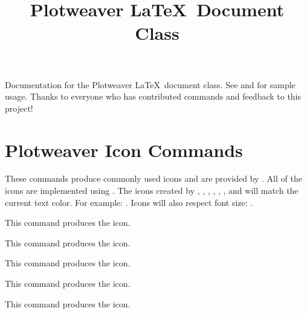 \documentclass[article,ariandor]{plotweaver}
\title{Plotweaver \LaTeX~Document Class}
\author{}
\date{}
\begin{document}
\maketitle

Documentation for the Plotweaver \LaTeX~document class. See  and  for sample usage. Thanks to everyone who has contributed commands and feedback to this project! 

\tableofcontents

\section{Plotweaver Icon Commands}
These commands produce commonly used icons and are provided by . All of the icons are implemented using . The icons created by , , , , , , and  will match the current text color. For example: \textcolor{red}{\action} \textcolor{blue}{\action} \textcolor{green}{\action}. Icons will also respect font size: {\Large\action} \action {\scriptsize\;\action}.

\begin{docCommand}[
    doc name        = action,
    doc description = { \action },
    doc updated     = 2026-08-11,
  ]{}{}
  This command produces the \action icon.
\end{docCommand}

\begin{docCommand}[
    doc name        = doubleAction,
    doc description = { \doubleAction },
    doc updated     = 2026-08-11,
  ]{}{}
  This command produces the \doubleAction icon.
\end{docCommand}

\begin{docCommand}[
    doc name        = tripleAction,
    doc description = { \tripleAction },
    doc updated     = 2026-08-11,
    ]{}{}
  This command produces the \tripleAction icon.
\end{docCommand}

\begin{docCommand}[
    doc name        = freeAction,
    doc description = { \freeAction },
    doc updated     = 2026-08-11,
  ]{}{}
  This command produces the \freeAction icon.
\end{docCommand}

\begin{docCommand}[
    doc name        = reaction,
    doc description = { \reaction },
  ]{}{}
  This command produces the \reaction icon.
\end{docCommand}
\end{document}
